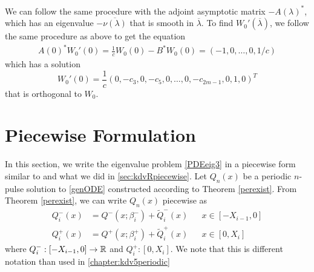 \documentclass[thesis.tex]{subfiles}
\begin{document}
We can follow the same procedure with the adjoint asymptotic matrix $-A(\lambda)^*$, which has an eigenvalue $-\overline{\nu(\lambda)}$ that is smooth in $\overline{\lambda}$. To find $W_0'(\overline{\lambda})$, we follow the same procedure as above to get the equation
\begin{align*}
A(0)^* W_0'(0) = \frac{1}{c} W_0(0) - B^* W_0(0)
= (-1, 0, \dots, 0, 1/c)
\end{align*}
which has a solution 
\[
W_0'(0) = \frac{1}{c} \left( 0, -c_3, 0, -c_5, 0, \dots, 0, -c_{2m-1}, 0, 1, 0\right)^T
\]
that is orthogonal to $W_0$.

\section{Piecewise Formulation}

In this section, we write the eigenvalue problem \cref{PDEeig3} in a piecewise form similar to \cite{Sandstede1998} and what we did in \cref{sec:kdvRpiecewise}. Let $Q_n(x)$ be a periodic $n$-pulse solution to \eqref{genODE} constructed according to Theorem \ref{perexist}. From Theorem \ref{perexist}, we can write $Q_n(x)$ piecewise as
\begin{equation}\label{Qnppiece}
\begin{aligned}
Q_i^-(x) &= Q^-(x; \beta_i^-) + \tilde{Q}_i^-(x) && x \in [-X_{i-1}, 0] \\
Q_i^+(x) &= Q^+(x; \beta_i^+) + \tilde{Q}_i^+(x) && x \in [0, X_i]
\end{aligned}
\end{equation}
where $Q_i^-: [-X_{i-1}, 0] \rightarrow \mathbb{R}$ and $Q_i^+: [0, X_i]$. We note that this is different notation than used in \cref{chapter:kdv5periodic}
\end{document}
